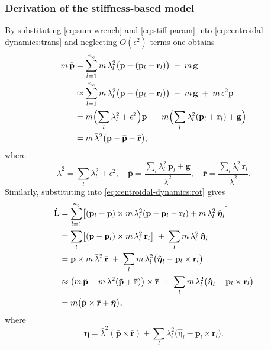 \documentclass[main.tex]{subfiles}
\begin{document}
\begin{sloppypar}
\subsubsection*{Derivation of the stiffness‐based model}
By substituting \eqref{eq:sum‐wrench} and \eqref{eq:stiff‐param} into \eqref{eq:centroidal‐dynamics:trans} and neglecting $O(\epsilon^2)$ terms one obtains
\begin{align}
m\,\ddot{\mathbf{p}}
&= \sum_{l=1}^{n_e} m\,\lambda_l^2\bigl(\mathbf{p} - (\mathbf{p}_l + \mathbf{r}_l)\bigr) \;-\; m\,\mathbf{g}
\notag\\
&\approx \sum_{l=1}^{n_e} m\,\lambda_l^2\bigl(\mathbf{p} - (\mathbf{p}_l + \mathbf{r}_l)\bigr) \;-\; m\,\mathbf{g} \;+\; m\,\epsilon^2 \mathbf{p}
\notag\\
&= m\Bigl(\sum_{l}\lambda_l^2 + \epsilon^2\Bigr)\mathbf{p} \;-\; m\Bigl(\sum_{l}\lambda_l^2(\mathbf{p}_l + \mathbf{r}_l) + \mathbf{g}\Bigr)
\notag\\
&= m\,\bar\lambda^2\bigl(\mathbf{p} - \mathbf{\bar{p}} - \mathbf{\bar{r}}\bigr),
\label{eq:deriv‐trans}
\end{align}
where
\[
\bar\lambda^2 = \sum_{l}\lambda_l^2 + \epsilon^2,
\quad
\mathbf{\bar{p}} = \frac{\sum_{l}\lambda_l^2\,\mathbf{p}_l + \mathbf{g}}{\bar\lambda^2},
\quad
\mathbf{\bar{r}} = \frac{\sum_{l}\lambda_l^2\,\mathbf{r}_l}{\bar\lambda^2}.
\]
Similarly, substituting into \eqref{eq:centroidal‐dynamics:rot} gives
\begin{align}
\dot{\mathbf{L}}
&= \sum_{l=1}^{n_e}\bigl[(\mathbf{p}_l - \mathbf{p})\times m\,\lambda_l^2(\mathbf{p} - \mathbf{p}_l - \mathbf{r}_l) + m\,\lambda_l^2\,\mathbf{\hat{\boldsymbol{\eta}}}_l\Bigr]
\notag\\
&= \sum_{l}\bigl[(\mathbf{p} - \mathbf{p}_l)\times m\,\lambda_l^2\,\mathbf{r}_l\bigr]
   \;+\;\sum_{l}m\,\lambda_l^2\,\mathbf{\hat{\boldsymbol{\eta}}}_l
\notag\\
&= \mathbf{p} \times m\,\bar\lambda^2\,\mathbf{\bar{r}}
   \;+\;\sum_{l}m\,\lambda_l^2\bigl(\mathbf{\hat{\boldsymbol{\eta}}}_l - \mathbf{p}_l\times \mathbf{r}_l\bigr)
\notag\\
&\approx \bigl(m\,\ddot{\mathbf{p}} + m\,\bar\lambda^2(\mathbf{\bar{p}}+\mathbf{\bar{r}})\bigr)\times \mathbf{\bar{r}}
   \;+\;\sum_{l}m\,\lambda_l^2\bigl(\mathbf{\hat{\boldsymbol{\eta}}}_l - \mathbf{p}_l\times \mathbf{r}_l\bigr)
\notag\\
&= m\bigl(\ddot{\mathbf{p}}\times \mathbf{\bar{r}} + \mathbf{\bar{\boldsymbol{\eta}}}\bigr),
\label{eq:deriv‐rot}
\end{align}
where
\[
\mathbf{\bar{\boldsymbol{\eta}}}
= \bar\lambda^2(\mathbf{\bar{p}}\times \mathbf{\bar{r}})
  + \sum_{l}\lambda_l^2\bigl(\mathbf{\hat{\boldsymbol{\eta}}}_l - \mathbf{p}_l\times \mathbf{r}_l\bigr).
\]


\end{sloppypar}
\end{document}
